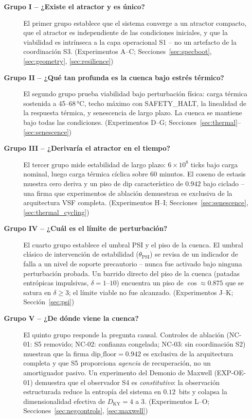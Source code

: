 \documentclass[11pt, a4paper]{article}
\begin{document}
\begin{description}

  \item[\textbf{Grupo I -- ¿Existe el atractor y es único?}]
    El primer grupo establece que el sistema converge a un atractor
    compacto, que el atractor es independiente de las condiciones iniciales,
    y que la viabilidad es intrínseca a la capa operacional S1 -- no
    un artefacto de la coordinación S3.
    (Experimentos A--C; Secciones~\ref{sec:specboot}, \ref{sec:geometry},
    \ref{sec:resilience})

  \item[\textbf{Grupo II -- ¿Qué tan profunda es la cuenca bajo estrés térmico?}]
    El segundo grupo prueba viabilidad bajo perturbación física: carga
    térmica sostenida a 45--68\,°C, techo máximo con SAFETY\_HALT, la
    linealidad de la respuesta térmica, y senescencia de largo plazo.
    La cuenca se mantiene bajo todas las condiciones.
    (Experimentos D--G; Secciones~\ref{sec:thermal}--\ref{sec:senescence})

  \item[\textbf{Grupo III -- ¿Derivaría el atractor en el tiempo?}]
    El tercer grupo mide estabilidad de largo plazo: $6\times 10^8$ ticks
    bajo carga nominal, luego carga térmica cíclica sobre 60 minutos.
    El coseno de estasis muestra cero deriva y un piso de dip característico
    de $0.942$ bajo ciclado -- una firma que experimentos de ablación
    demuestran es exclusiva de la arquitectura VSF completa.
    (Experimentos H--I; Secciones~\ref{sec:senescence}, \ref{sec:thermal_cycling})

  \item[\textbf{Grupo IV -- ¿Cuál es el límite de perturbación?}]
    El cuarto grupo establece el umbral PSI y el piso de la cuenca.
    El umbral clásico de intervención de estabilidad ($\theta_\text{PSI}$)
    se revisa de un indicador de falla a un nivel de soporte precautorio --
    nunca fue activado bajo ninguna perturbación probada.
    Un barrido directo del piso de la cuenca (patadas entrópicas impulsivas, $\delta=1$--$10$)
    encuentra un piso de $\cos \approx 0.875$ que se satura en $\delta \geq 3$;
    el límite viable no fue alcanzado.
    (Experimentos J--K; Sección~\ref{sec:psi})

  \item[\textbf{Grupo V -- ¿De dónde viene la cuenca?}]
    El quinto grupo responde la pregunta causal.
    Controles de ablación (NC-01: S5 removido; NC-02: confianza congelada;
    NC-03: sin coordinación S2) muestran que la firma $\text{dip\_floor}=0.942$
    es exclusiva de la arquitectura completa y que S5
    proporciona \emph{agencia} de recuperación, no un amortiguador pasivo.
    Un experimento del Demonio de Maxwell (EXP-OE-01) demuestra que el observador S4
    es \emph{constitutivo}: la observación estructurada reduce la entropía del sistema
    en $0.12$~bits y colapsa la dimensionalidad efectiva de
    $D_\text{KY}=4$ a $3$.
    (Experimentos L--O; Secciones~\ref{sec:negcontrols}, \ref{sec:maxwell})

\end{description}
\end{document}
